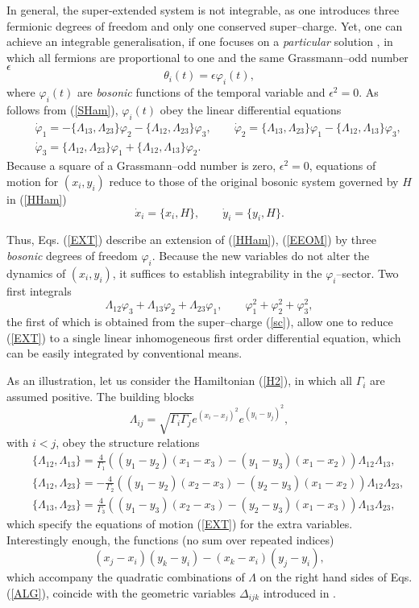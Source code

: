 \documentclass[12pt]{article}
\def\be{\begin{equation}}
\def\ee{\end{equation}}
\def\bea{\begin{eqnarray}}
\def\eea{\end{eqnarray}}
\begin{document}
In general, the super-extended system is not integrable, as one introduces three fermionic degrees of freedom and only one conserved super--charge. Yet, one can achieve an integrable generalisation, if one focuses on a {\it particular} solution \cite{AG}, in which all fermions are proportional to one and the same Grassmann--odd number $\epsilon$
\be
\theta_i (t)=\epsilon \varphi_i(t),
\ee
where $\varphi_i(t)$ are {\it bosonic} functions of the temporal variable and $\epsilon^2=0$. As follows from (\ref{SHam}), $\varphi_i(t)$ obey the linear differential equations
\bea\label{EXT}
&&
{\dot\varphi}_1=-\{\Lambda_{13},\Lambda_{23} \} \varphi_2-\{\Lambda_{12},\Lambda_{23} \} \varphi_3, \qquad {\dot\varphi}_2=\{\Lambda_{13},\Lambda_{23} \} \varphi_1-\{\Lambda_{12},\Lambda_{13} \} \varphi_3,
\nonumber\\[2pt]
&&
{\dot\varphi}_3=\{\Lambda_{12},\Lambda_{23} \} \varphi_1+\{\Lambda_{12},\Lambda_{13} \} \varphi_2.
\eea
Because a square of a Grassmann--odd number is zero, $\epsilon^2=0$, equations of motion for $(x_i,y_i)$ reduce to those of the original bosonic system governed by $H$ in (\ref{HHam})
\be\label{EEOM}
{\dot x}_i=\{x_i,H\}, \qquad  {\dot y}_i=\{y_i,H\}.
\ee

Thus, Eqs. (\ref{EXT}) describe an extension of (\ref{HHam}), (\ref{EEOM}) by three {\it bosonic} degrees of freedom $\varphi_i$. Because the new variables do not alter the dynamics of $(x_i,y_i)$, it suffices to establish integrability in the $\varphi_i$--sector. Two first integrals
\be\label{INT}
\Lambda_{12} \varphi_3+\Lambda_{13} \varphi_2+\Lambda_{23} \varphi_1, \qquad \varphi_1^2+\varphi_2^2+\varphi_3^2,
\ee
the first of which is obtained from the super--charge (\ref{sc}),
allow one to reduce (\ref{EXT}) to a single linear inhomogeneous first order differential equation, which can be easily integrated by conventional means.

As an illustration, let us consider the Hamiltonian (\ref{H2}), in which all $\Gamma_i$ are assumed positive. The building blocks
\be
\Lambda_{ij}=\sqrt{\Gamma_i \Gamma_j}  e^{{\left(x_i-x_j\right)}^2} e^{{\left(y_i-y_j \right)}^2},
\ee
with $i<j$, obey the structure relations
\bea\label{ALG}
&&
\{\Lambda_{12},\Lambda_{13} \}=\frac{4}{\Gamma_1} \left( (y_1-y_2)(x_1-x_3)-(y_1-y_3)(x_1-x_2)\right) \Lambda_{12} \Lambda_{13},
\nonumber\\[2pt]
&&
\{\Lambda_{12},\Lambda_{23} \}=-\frac{4}{\Gamma_2} \left( (y_1-y_2)(x_2-x_3)-(y_2-y_3)(x_1-x_2)\right) \Lambda_{12} \Lambda_{23},
\nonumber\\[2pt]
&&
\{\Lambda_{13},\Lambda_{23} \}=\frac{4}{\Gamma_3} \left( (y_1-y_3)(x_2-x_3)-(y_2-y_3)(x_1-x_3)\right) \Lambda_{13} \Lambda_{23},
\eea
which specify the equations of motion (\ref{EXT}) for the extra variables. Interestingly enough, the functions (no sum over repeated indices)
\be
(x_j-x_i)(y_k-y_i)-(x_k-x_i)(y_j-y_i),
\ee
which accompany the quadratic combinations of $\Lambda$ on the right hand sides of Eqs. (\ref{ALG}), coincide with the geometric variables $\Delta_{ijk}$ introduced in \cite{BBM}.
\end{document}
